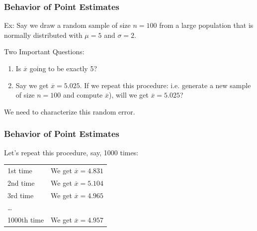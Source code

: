 \documentclass[handout]{beamer}
\newcommand{\blue}[1]{\textcolor{blue2}{#1}}
\newcommand{\xbar}{\overline{x}}
\begin{document}
\begin{frame}[fragile]
\frametitle{Behavior of Point Estimates}
Ex:  Say we draw a random sample of size $n=100$ from a large population that is normally distributed with $\mu=5$ and $\sigma=2$.

\pause \vskip 0.5cm

\blue{Two Important Questions}:
\begin{enumerate}
\pause \item Is $\xbar$ going to be exactly 5?
\pause \item Say we get $\overline{x}=5.025$.  If we repeat this procedure: i.e. generate a \blue{new} sample of size $n=100$ and compute $\overline{x}$), will we get $\overline{x} = 5.025$?
\end{enumerate}

\pause We need to characterize this random error.

\end{frame}


\begin{frame}[fragile]
\frametitle{Behavior of Point Estimates}
Let's repeat this procedure, say, 1000 times:

\pause \begin{center}
\begin{tabular}{ll}
1st time & We get $\overline{x}=4.831$\\
2nd time & We get $\overline{x}=5.104$\\
3rd time & We get $\overline{x}=4.965$\\
\ldots & \\
1000th time & We get $\overline{x}=4.957$\\
\end{tabular}
\end{center}

\end{frame}
\end{document}
